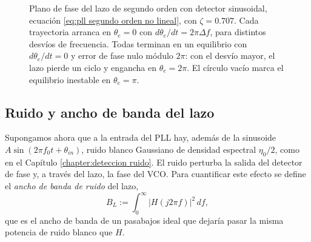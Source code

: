 \begin{figure}
    \begin{center}
    \end{center}
    \caption{Plano de fase del lazo de segundo orden con detector sinusoidal, ecuación \eqref{eq:pll segundo orden no lineal}, con $\zeta=0.707$. Cada trayectoria arranca en $\theta_e=0$ con $d\theta_e/dt=2\pi\Delta f$, para distintos desvíos de frecuencia. Todas terminan en un equilibrio con $d\theta_e/dt=0$ y error de fase nulo módulo $2\pi$: con el desvío mayor, el lazo pierde un ciclo y engancha en $\theta_e=2\pi$. El círculo vacío marca el equilibrio inestable en $\theta_e=\pi$.}\label{fig:pll plano fase}
\end{figure}

\subsection{Ruido y ancho de banda del lazo}\label{sec:pll ruido}

Supongamos ahora que a la entrada del PLL hay, además de la sinusoide $A\sin(2\pi f_0t+\theta_{in})$, ruido blanco Gaussiano de densidad espectral $\eta_0/2$, como en el Capítulo \ref{chapter:deteccion ruido}. El ruido perturba la salida del detector de fase y, a través del lazo, la fase del VCO. Para cuantificar este efecto se define el \emph{ancho de banda de ruido} del lazo,
\begin{equation}\label{eq:ancho banda ruido}
    B_L := \int_0^\infty |H(j2\pi f)|^2\, df,
\end{equation}
que es el ancho de banda de un pasabajos ideal que dejaría pasar la misma potencia de ruido blanco que $H$.

